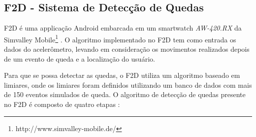 \subsection{F2D - Sistema de Detecção de Quedas}
\label{subsec:F2D_System}
F2D é uma applicação Android embarcada em um smartwatch \textit{AW-420.RX} da Simvalley Mobile\footnote{http://www.simvalley-mobile.de/} \citep{kostopoulos2015f2d}. O algoritmo implementado no F2D tem como entrada os dados do acelerômetro, levando em consideração os movimentos realizados depois de um evento de queda e a localização do usuário. 

Para que se possa detectar as quedas, o F2D utiliza um algoritmo baseado em limiares, onde os limiares foram definidos utilizando um banco de dados com mais de 150 eventos simulados de queda. O algoritmo de detecção de quedas presente no F2D é composto de quatro etapas \citep{kostopoulos2015f2d}:

